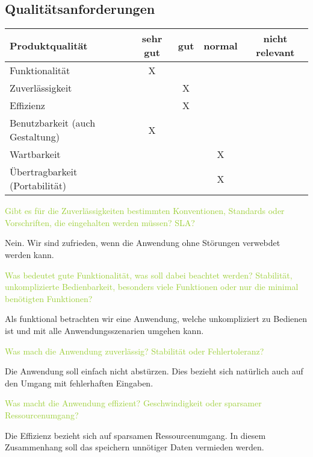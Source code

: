 \subsection{Qualitätsanforderungen}

\begin{center}
    \begin{tabular} {l | c | c | c | c}
        \hline
        Produktqualität & sehr gut & gut & normal & nicht relevant \\
        \hline
        Funktionalität & X & & & \\
        \hline
        Zuverlässigkeit & & X & & \\
        \hline
        Effizienz & & X & & \\
        \hline
        Benutzbarkeit (auch Gestaltung) & X & & & \\
        \hline
        Wartbarkeit & & & X & \\
        \hline
        Übertragbarkeit (Portabilität) & & & X & \\
        \hline
    \end{tabular}
\end{center}

\textcolor{YellowGreen}{Gibt es für die Zuverlässigkeiten bestimmten Konventionen, Standards oder Vorschriften, die eingehalten werden müssen? SLA?}

\textcolor{NavyBlue}{Nein. Wir sind zufrieden, wenn die Anwendung ohne Störungen verwebdet werden kann.}

\textcolor{YellowGreen}{Was bedeutet gute Funktionalität, was soll dabei beachtet werden? Stabilität, unkomplizierte Bedienbarkeit, besonders viele Funktionen oder nur die minimal benötigten Funktionen?}

\textcolor{NavyBlue}{Als funktional betrachten wir eine Anwendung, welche unkompliziert zu Bedienen ist und mit alle Anwendungsszenarien umgehen kann.}


\textcolor{YellowGreen}{Was mach die Anwendung zuverlässig? Stabilität oder Fehlertoleranz?}

\textcolor{NavyBlue}{Die Anwendung soll einfach nicht abstürzen. Dies bezieht sich natürlich auch auf den Umgang mit fehlerhaften Eingaben.}


\textcolor{YellowGreen}{Was macht die Anwendung effizient? Geschwindigkeit oder sparsamer Ressourcenumgang?}

\textcolor{NavyBlue}{Die Effizienz bezieht sich auf sparsamen Ressourcenumgang. In diesem Zusammenhang soll das speichern unnötiger Daten vermieden werden.}


